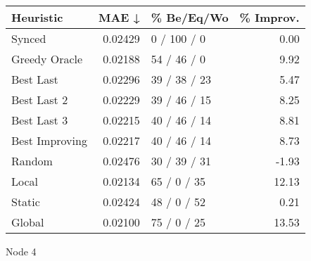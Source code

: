 \begin{tabular}{lrlr}
\toprule
\textbf{Heuristic} & \textbf{MAE ↓} & \textbf{\% Be/Eq/Wo} & \textbf{\% Improv.} \\
\midrule
            Synced &        0.02429 &          0 / 100 / 0 &                0.00 \\
     Greedy Oracle &        0.02188 &          54 / 46 / 0 &                9.92 \\
         Best Last &        0.02296 &         39 / 38 / 23 &                5.47 \\
       Best Last 2 &        0.02229 &         39 / 46 / 15 &                8.25 \\
       Best Last 3 &        0.02215 &         40 / 46 / 14 &                8.81 \\
    Best Improving &        0.02217 &         40 / 46 / 14 &                8.73 \\
            Random &        0.02476 &         30 / 39 / 31 &               -1.93 \\
             Local &        0.02134 &          65 / 0 / 35 &               12.13 \\
            Static &        0.02424 &          48 / 0 / 52 &                0.21 \\
            Global &        0.02100 &          75 / 0 / 25 &               13.53 \\
\bottomrule
\end{tabular}
\caption{Node 4}
\label{tab:non_lr05_le1_bs4_4}
